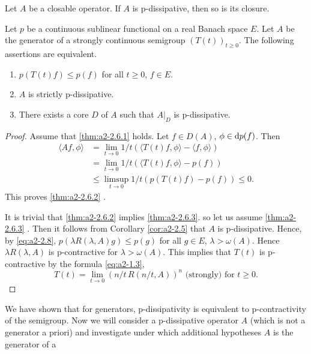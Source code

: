 \begin{corollary}\label{cor:a2-2.5}
Let $A$ be a closable operator.
If $A$ is p-dissipative, then so is its closure.
\end{corollary}
\begin{theorem}\label{thm:a2-2.6}
Let $p$ be a continuous sublinear functional on a real Banach space $E$.
Let $A$ be the generator of a strongly continuous semigroup $(T(t))_{t\geq 0}$.
The following assertions are equivalent.

\begin{enumerate}[\upshape (a)]
\item \label{thm:a2-2.6.1}
$p(T(t)f) \leq p(f)$ for all $t \geq 0$, $f \in E$.

\item \label{thm:a2-2.6.2}
$A$ is strictly p-dissipative.
 
\item \label{thm:a2-2.6.3}
There exists a core $D$ of $A$ such that $A|_{D}$ is p-dissipative.
\end{enumerate}
\end{theorem}
\begin{proof}
Assume that \ref{thm:a2-2.6.1} holds.
Let $f \in D(A)$, $\phi \in \mathop{}\!\mathrm{d}{p}(f)$.
Then 
\begin{align*}
	\langle Af,\phi \rangle &= \lim_{t\to 0} 1/t(\langle T(t)f,\phi \rangle - \langle f,\phi \rangle) \\
	&= \lim_{t\to 0} 1/t(\langle T(t)f,\phi \rangle - p(f)) \\
	&\leq \limsup_{t\to 0} 1/t(p(T(t)f) - p(f)) \leq 0. 
\end{align*}
This proves \ref{thm:a2-2.6.2} . 

It is trivial that \ref{thm:a2-2.6.2} implies \ref{thm:a2-2.6.3}.  
so let us assume \ref{thm:a2-2.6.3} . 
Then it follows from Corollary \ref{cor:a2-2.5}   that $A$ is p-dissipative.
Hence, by \eqref{eq:a2-2.8},  $p(\lambda R(\lambda,A)g) \leq p(g)$ for all $g \in E$, $\lambda > \omega(A)$.
Hence $\lambda R(\lambda,A)$ is p-contractive for $\lambda > \omega(A)$.
This implies that $T(t)$ is p-contractive by the formula \eqref{eq:a2-1.3}, 
\[
T(t) = \lim_{t\to 0} (n/t\,R(n/t,A))^{n} \text{ (strongly) for } t \geq 0.
\]
\end{proof}
We have shown that for generators, p-dissipativity is equivalent to p-contractivity of the semigroup.
Now we will consider a p-dissipative operator $A$ (which is not a generator a priori) and investigate under which additional hypotheses $A$ is the generator of a
